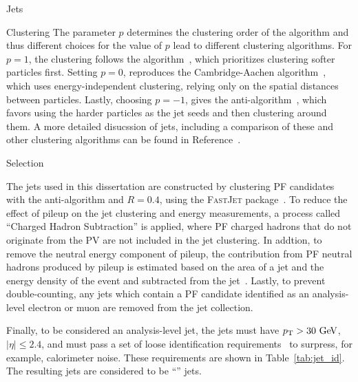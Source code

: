 \begin{section}{Jets}
\begin{subsection}{Clustering}
The parameter $p$ determines the clustering order of the algorithm and thus different choices for the value of $p$ lead to different clustering algorithms.
For $p = 1$, the clustering follows the \kT algorithm~\cite{Ellis:1993tq}, which prioritizes clustering softer particles first.
Setting $p = 0$, reproduces the Cambridge-Aachen algorithm~\cite{Dokshitzer:1997in}, which uses energy-independent clustering, relying only on the spatial distances between particles.
Lastly, choosing $p = -1$, gives the anti-\kT algorithm~\cite{Cacciari:2008gp}, which favors using the harder particles as the jet seeds and then clustering around them.
A more detailed disucssion of jets, including a comparison of these and other clustering algorithms can be found in Reference~\cite{Salam:2009jx}.

\end{subsection}

\begin{subsection}{Selection}

The jets used in this dissertation are constructed by clustering PF candidates with the anti-\kT algorithm and $R = 0.4$, using the \textsc{FastJet} package~\cite{Cacciari:2011ma}.
To reduce the effect of pileup on the jet clustering and energy measurements, a process called ``Charged Hadron Subtraction'' is applied, where PF charged hadrons that do not originate from the PV are not included in the jet clustering.
In addtion, to remove the neutral energy component of pileup, the contribution from PF neutral hadrons produced by pileup is estimated based on the area of a jet and the energy density of the event and subtracted from the jet~\cite{Cacciari:2007fd}.
Lastly, to prevent double-counting, any jets which contain a PF candidate identified as an analysis-level electron or muon are removed from the jet collection. 

Finally, to be considered an analysis-level jet, the jets must have $p_\mathrm{T} > 30~\mathrm{Ge\kern -0.1em V}$, $|\eta| \leq 2.4$, and must pass a set of loose identification requirements~\cite{jet_id,1748-0221-6-11-P11002} to surpress, for example, calorimeter noise.
These requirements are shown in Table~\ref{tab:jet_id}.
The resulting jets are considered to be ``\smallR'' jets.


\end{subsection}
\end{section}
